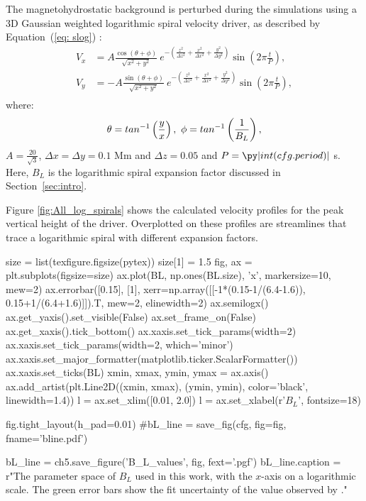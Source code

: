 The magnetohydrostatic background is perturbed during the simulations using a 3D Gaussian weighted logarithmic spiral velocity driver, as described by Equation~(\ref{eq: slog}) \citep{mumford2015}:
\begin{subequations}
    \begin{align}
    V_x &= A \frac{\cos(\theta + \phi)}{\sqrt{x^2 + y^2}}\ e^{-\left(\frac{z^2}{\Delta z^2} + \frac{x^2}{\Delta x^2} + \frac{y^2}{\Delta y^2}\right)} \sin \left(2\pi \frac{t}{P}\right),\\
    V_y &= - A \frac{\sin(\theta + \phi)}{\sqrt{x^2 + y^2}}\ e^{-\left(\frac{z^2}{\Delta z^2} + \frac{x^2}{\Delta x^2} + \frac{y^2}{\Delta y^2}\right)} \sin \left(2\pi \frac{t}{P}\right),\label{eq:Slog}\\
    \end{align}
    \label{eq: slog}
\end{subequations}
where:
\begin{equation*}
\theta = tan^{-1}\left(\frac{y}{x}\right),\ \phi = tan^{-1}\left(\frac{1}{B_L}\right),\notag	
\end{equation*}
$A=\frac{20}{\sqrt{3}}$, $\Delta x = \Delta y = 0.1$ Mm and $\Delta z = 0.05$ and $P=\py|int(cfg.period)|$ s.
Here, $B_L$ is the logarithmic spiral expansion factor discussed in Section~\ref{sec:intro}.

Figure \ref{fig:All_log_spirals} shows the calculated velocity profiles for the peak vertical height of the driver.
Overplotted on these profiles are streamlines that trace a logarithmic spiral with different expansion factors.

\begin{pycode}[chapter5]
size = list(texfigure.figsize(pytex))
size[1] = 1.5
fig, ax = plt.subplots(figsize=size)
ax.plot(BL, np.ones(BL.size), 'x', markersize=10, mew=2)
ax.errorbar([0.15], [1], xerr=np.array([[-1*(0.15-1/(6.4-1.6)), 0.15+1/(6.4+1.6)]]).T, mew=2, elinewidth=2)
ax.semilogx()
ax.get_yaxis().set_visible(False)
ax.set_frame_on(False)
ax.get_xaxis().tick_bottom()
ax.xaxis.set_tick_params(width=2)
ax.xaxis.set_tick_params(width=2, which='minor')
ax.xaxis.set_major_formatter(matplotlib.ticker.ScalarFormatter())
ax.xaxis.set_ticks(BL)
xmin, xmax, ymin, ymax = ax.axis()
ax.add_artist(plt.Line2D((xmin, xmax), (ymin, ymin), color='black', linewidth=1.4))
l = ax.set_xlim([0.01, 2.0])
l = ax.set_xlabel(r'$B_L$', fontsize=18)

fig.tight_layout(h_pad=0.01)
#bL_line = save_fig(cfg, fig=fig, fname='bline.pdf')

bL_line = ch5.save_figure('B_L_values', fig, fext='.pgf')
bL_line.caption = r"The parameter space of $B_L$ used in this work, with the $x$-axis on a logarithmic scale. The green error bars show the fit uncertainty of the value observed by \citet{bonet2008}."
\end{pycode}

